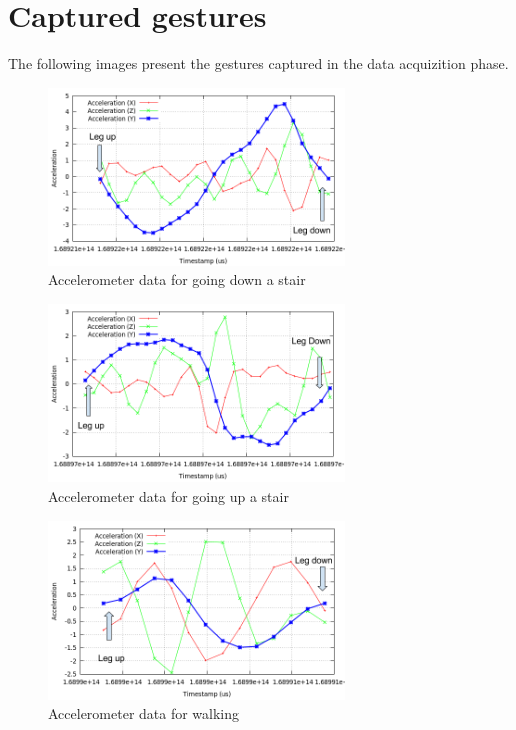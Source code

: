 \chapter{Captured gestures}
\label{chap:gestures}

The following images present the gestures captured in the data acquizition phase.

\begin{figure}
    \centering
    \includegraphics[width=0.7\textwidth]{src/img/xyz-stairs-down.png}
    \caption{Accelerometer data for going down a stair}
    \label{fig:xyz-stairs-down}
\end{figure}


\begin{figure}
    \centering
    \includegraphics[width=0.7\textwidth]{src/img/xyz-stairs-up.png}
    \caption{Accelerometer data for going up a stair}
    \label{fig:xyz-stairs-up}
\end{figure}


\begin{figure}
    \centering
    \includegraphics[width=0.7\textwidth]{src/img/xyz-walking.png}
    \caption{Accelerometer data for walking}
    \label{fig:xyz-walking}
\end{figure}


